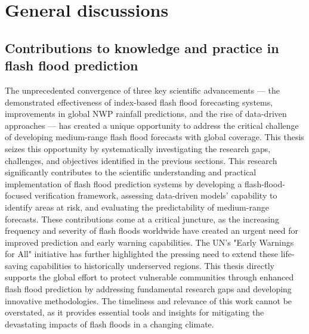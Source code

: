 \ClearShipoutPicture
{}

\chapter{General discussions}
\label{general_discussions}

\section{Contributions to knowledge and practice in flash flood prediction}


The unprecedented convergence of three key scientific advancements — the demonstrated effectiveness of index-based flash flood forecasting systems, improvements in global NWP rainfall predictions, and the rise of data-driven approaches — has created a unique opportunity to address the critical challenge of developing medium-range flash flood forecasts with global coverage. This thesis seizes this opportunity by systematically investigating the research gaps, challenges, and objectives identified in the previous sections. This research significantly contributes to the scientific understanding and practical implementation of flash flood prediction systems by developing a flash-flood-focused verification framework, assessing data-driven models' capability to identify areas at risk, and evaluating the predictability of medium-range forecasts. These contributions come at a critical juncture, as the increasing frequency and severity of flash floods worldwide have created an urgent need for improved prediction and early warning capabilities. The UN's "Early Warnings for All" initiative has further highlighted the pressing need to extend these life-saving capabilities to historically underserved regions. This thesis directly supports the global effort to protect vulnerable communities through enhanced flash flood prediction by addressing fundamental research gaps and developing innovative methodologies. The timeliness and relevance of this work cannot be overstated, as it provides essential tools and insights for mitigating the devastating impacts of flash floods in a changing climate.

